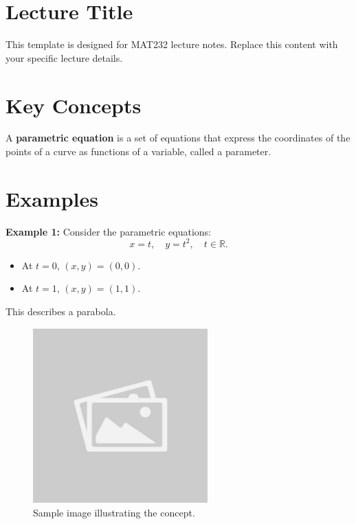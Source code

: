 \documentclass{article}
\begin{document}
\section*{Lecture Title}
\begin{notebox}
This template is designed for MAT232 lecture notes. Replace this content with your specific lecture details.
\end{notebox}

\section*{Key Concepts}
\begin{definitionbox}
A \textbf{parametric equation} is a set of equations that express the coordinates of the points of a curve as functions of a variable, called a parameter.
\end{definitionbox}

\section*{Examples}
\begin{examplebox}
\textbf{Example 1:} Consider the parametric equations:
\[ x = t, \quad y = t^2, \quad t \in \mathbb{R}. \]
\begin{itemize}
    \item At $t = 0$, $(x, y) = (0, 0)$.
    \item At $t = 1$, $(x, y) = (1, 1)$.
\end{itemize}
This describes a parabola.
\end{examplebox}

\begin{figure}[H]
    \centering
    \includegraphics[width=0.6\textwidth]{sample_image.jpg}
    \caption{Sample image illustrating the concept.}
    \label{fig:sample_image}
\end{figure}
\end{document}
